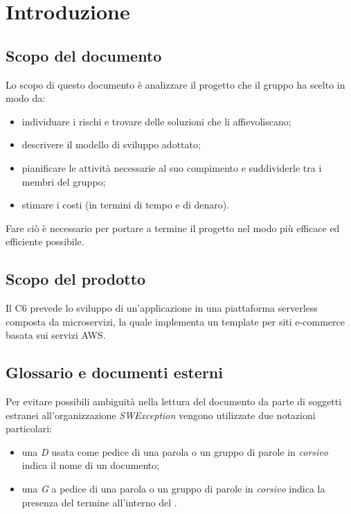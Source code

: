 \section{Introduzione} \label{_introduzione}

\subsection{Scopo del documento}
Lo scopo di questo documento è analizzare il progetto che il gruppo ha scelto in modo da:
\begin{itemize}
    \item individuare i rischi e trovare delle soluzioni che li affievoliscano;
    \item descrivere il modello di sviluppo adottato;
    \item pianificare le attività necessarie al suo compimento e suddividerle tra i membri del gruppo;
    \item stimare i costi (in termini di tempo e di denaro).
\end{itemize}
Fare ciò è necessario per portare a termine il progetto nel modo più efficace ed efficiente possibile.

\subsection{Scopo del prodotto}
Il  C6 prevede lo sviluppo di un'applicazione in una piattaforma serverless composta da microservizi, la quale implementa un template per siti e-commerce basata sui servizi AWS.

\subsection{Glossario  e documenti esterni}
Per evitare possibili ambiguità nella lettura del documento da parte di soggetti estranei all'organizzazione \textit{SWException} vengono utilizzate due notazioni particolari:
\begin{itemize}
    \item una \textit{D} usata come pedice di una parola o un gruppo di parole in \textit{corsivo} indica il nome di un documento;
    \item una \textit{G} a pedice di una parola o un gruppo di parole in \textit{corsivo} indica la presenza del termine all'interno del .
\end{itemize}


